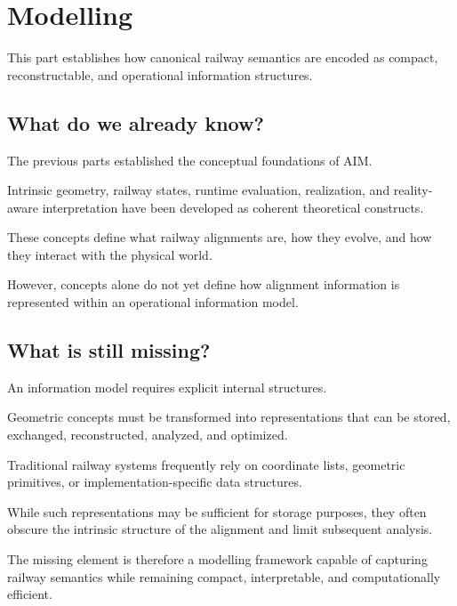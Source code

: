 
\chapter*{Modelling}
{}

This part establishes how canonical railway semantics are encoded as
compact, reconstructable, and operational information structures.

\section*{What do we already know?}

The previous parts established the conceptual foundations of AIM.

Intrinsic geometry, railway states, runtime evaluation, realization,
and reality-aware interpretation have been developed as coherent
theoretical constructs.

These concepts define what railway alignments are, how they evolve,
and how they interact with the physical world.

However, concepts alone do not yet define how alignment information is
represented within an operational information model.

\section*{What is still missing?}

An information model requires explicit internal structures.

Geometric concepts must be transformed into representations that can be
stored, exchanged, reconstructed, analyzed, and optimized.

Traditional railway systems frequently rely on coordinate lists,
geometric primitives, or implementation-specific data structures.

While such representations may be sufficient for storage purposes, they
often obscure the intrinsic structure of the alignment and limit
subsequent analysis.

The missing element is therefore a modelling framework capable of
capturing railway semantics while remaining compact, interpretable,
and computationally efficient.

